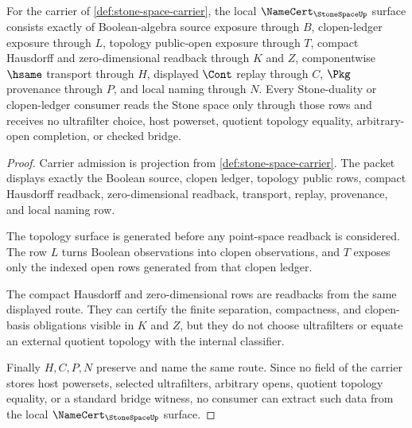 \begin{theorem}
\label{thm:stone-space-namecert-obligations}
For the carrier of \autoref{def:stone-space-carrier}, the local $\NameCert_{\StoneSpaceUp}$ surface consists exactly of Boolean-algebra source exposure through $B$, clopen-ledger exposure through $L$, topology public-open exposure through $T$, compact Hausdorff and zero-dimensional readback through $K$ and $Z$, componentwise $\hsame$ transport through $H$, displayed $\Cont$ replay through $C$, $\Pkg$ provenance through $P$, and local naming through $N$. Every Stone-duality or clopen-ledger consumer reads the Stone space only through those rows and receives no ultrafilter choice, host powerset, quotient topology equality, arbitrary-open completion, or checked bridge.
\end{theorem}
\begin{proof}
Carrier admission is projection from \autoref{def:stone-space-carrier}. The packet displays exactly the Boolean source, clopen ledger, topology public rows, compact Hausdorff readback, zero-dimensional readback, transport, replay, provenance, and local naming row.

The topology surface is generated before any point-space readback is considered. The row $L$ turns Boolean observations into clopen observations, and $T$ exposes only the indexed open rows generated from that clopen ledger.

The compact Hausdorff and zero-dimensional rows are readbacks from the same displayed route. They can certify the finite separation, compactness, and clopen-basis obligations visible in $K$ and $Z$, but they do not choose ultrafilters or equate an external quotient topology with the internal classifier.

Finally $H,C,P,N$ preserve and name the same route. Since no field of the carrier stores host powersets, selected ultrafilters, arbitrary opens, quotient topology equality, or a standard bridge witness, no consumer can extract such data from the local $\NameCert_{\StoneSpaceUp}$ surface.
\end{proof}

